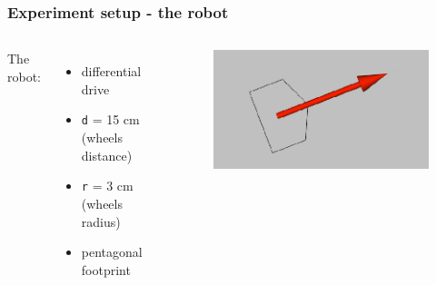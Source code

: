 \documentclass{beamer}
\begin{document}
\begin{frame}
\frametitle{Experiment setup - the robot}

\begin{columns}


The robot:
\begin{itemize}
  \item differential drive
  \item \texttt{d} = 15 cm (wheels distance)
  \item \texttt{r} = 3 cm (wheels radius)
  \item pentagonal footprint
\end{itemize}



\begin{figure}[H]
    \centering
    \includegraphics[scale=0.4]{img/rviz/footprint.png}
\end{figure}

\end{columns}

\end{frame}

\end{document}

